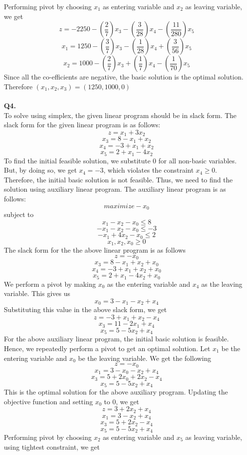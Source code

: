 \documentclass[11pt]{article}
\begin{document}
Performing pivot by choosing $x_1$ as entering variable and $x_2$ as leaving variable, we get
$$z = -2250 - \left(\frac{2}{7}\right)x_3 - \left(\frac{3}{28}\right)x_4 - \left(\frac{11}{280}\right)x_5$$ 
$$x_1 = 1250 - \left(\frac{3}{7}\right)x_3 - \left(\frac{1}{28}\right)x_4 + \left(\frac{3}{56}\right)x_5$$ 
$$x_2 = 1000 - \left(\frac{2}{7}\right)x_3 + \left(\frac{1}{7}\right)x_4 - \left(\frac{1}{70}\right)x_5$$ 
Since all the co-efficients are negative, the basic solution is the optimal solution. Therefore $(x_1,x_2,x_3) = (1250,1000,0)$\\\\
\vspace{5mm}
\hline
\vspace{5mm}
\textbf{Q4.}\\
To solve using simplex, the given linear program should be in slack form. The slack form for the given linear program is as follows:
$$z = x_1 + 3x_2$$
$$x_3 = 8 - x_1 + x_2$$
$$x_4 = -3 + x_1 + x_2$$
$$x_5 = 2 + x_1 - 4x_2$$
To find the initial feasible solution, we substitute 0 for all non-basic variables. But, by doing so, we get $x_4 = -3$, which violates the constraint $x_4 \geq 0$. Therefore, the initial basic solution is not feasible. Thus, we need to find the solution using auxiliary linear program. The auxiliary linear program is as follows:
$$ maximize -x_0$$
subject to
$$x_1 - x_2 - x_0 \leq 8$$
$$-x_1 - x_2 - x_0 \leq -3$$
$$-x_1 + 4x_2 - x_0 \leq 2$$
$$x_1,x_2,x_0 \geq 0$$
The slack form for the the above linear program is as follows
$$z = -x_0$$
$$x_3 = 8 - x_1 + x_2 + x_0$$
$$x_4 = -3 + x_1 + x_2 + x_0$$
$$x_5 = 2 + x_1 - 4x_2 + x_0$$
We perform a pivot by making $x_0$ as the entering variable and $x_4$ as the leaving variable. This gives us
$$x_0 = 3 - x_1 - x_2 + x_4$$
Substituting this value in the above slack form, we get
$$z = -3 + x_1 + x_2 - x_4$$
$$x_3 = 11 - 2x_1 + x_4$$
$$x_5 = 5 - 5x_2 + x_4$$
For the above auxiliary linear program, the initial basic solution is feasible. Hence, we repeatedly perform a pivot to get an optimal solution. Let $x_1$ be the entering variable and $x_0$ be the leaving variable. We get the following
$$z = -x_0$$
$$x_1 = 3 - x_0 -x_2 + x_4$$
$$x_3 = 5 + 2x_0 +2x_2 - x_4$$
$$x_5 = 5 - 5x_2 + x_4$$
This is the optimal solution for the above auxiliary program. Updating the objective function and setting $x_0$ to 0, we get
$$z = 3 + 2x_2 + x_4$$
$$x_1 = 3 - x_2 + x_4$$
$$x_3 = 5 + 2x_2 - x_4$$
$$x_5 = 5 - 5x_2 + x_4$$
Performing pivot by choosing $x_2$ as entering variable and $x_5$ as leaving variable, using tightest constraint, we get
\end{document}
